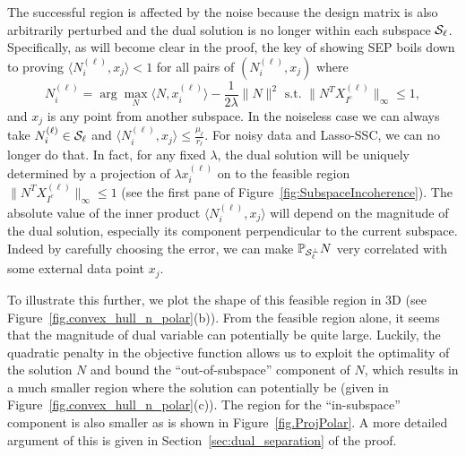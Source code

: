 \documentclass[12pt,heading]{ctexbook}
\begin{document}
The successful region is affected by the noise because the design matrix is also arbitrarily perturbed and the dual solution is no longer within each subspace $\mathcal{S}_\ell$. Specifically, as will become clear in the proof, the key of showing SEP boils down to proving
$
\langle N_i^{(\ell)}, x_j\rangle < 1
$
for all pairs of $(N_i^{(\ell)}, x_j)$ where
$$ N_i^{(\ell)}=\arg\max_{N} \langle N, x_i^{(\ell)}\rangle  -\frac{1}{2\lambda}\|N\|^2 \text{ s.t. }  \|N^TX_{I^c}^{(\ell)} \|_\infty \leq 1,$$
and $x_j$ is any point from another subspace. In the noiseless case we can always take $N_i^{(\ell)}\in\mathcal{S}_\ell$ and $\langle N_i^{(\ell)}, x_j\rangle \leq \frac{\mu_\ell}{r_\ell}$. For noisy data and Lasso-SSC, we can no longer do that. In fact, for any fixed $\lambda$, the dual solution will be uniquely determined by a projection of $\lambda x_i^{(\ell)}$ on to the feasible region $\|N^TX_{I^c}^{(\ell)} \|_\infty \leq 1$ (see the first pane of Figure~\ref{fig:SubspaceIncoherence}). The absolute value of the inner product $\langle N_i^{(\ell)}, x_j\rangle$ will depend on the magnitude of the dual solution, especially its component perpendicular to the current subspace. Indeed by carefully choosing the error, we can make $\mathbb{P}_{\mathcal{S}_\ell^{\perp}}N$ very correlated with some external data point $x_j$.


To illustrate this further, we plot the shape of this feasible region in 3D (see Figure~\ref{fig.convex_hull_n_polar}(b)). From the feasible region alone, it seems that the magnitude of dual variable can potentially be quite large. Luckily, the quadratic penalty in the objective function allows us to exploit the optimality of the solution $N$ and bound the ``out-of-subspace'' component of $N$, which results in a much smaller region where the solution can potentially be (given in Figure~\ref{fig.convex_hull_n_polar}(c)). The region for the ``in-subspace'' component is also smaller as is shown in Figure~\ref{fig.ProjPolar}. A more detailed argument of this is given in Section~\ref{sec:dual_separation} of the proof.
\end{document}
